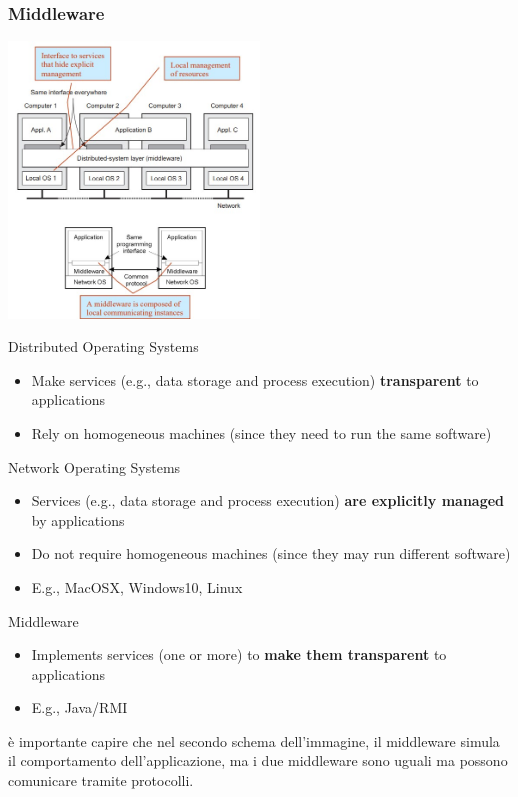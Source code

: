 \subsubsection{Middleware}
\begin{center}
    \includegraphics[width=0.5\textwidth]{img/Middleware1.jpg}
\end{center}
Distributed Operating Systems
\begin{itemize}
    \item Make services (e.g., data storage and process execution) \textbf{transparent} to applications
    \item Rely on homogeneous machines (since they need to run the same software)
\end{itemize}
Network Operating Systems
\begin{itemize}
    \item Services (e.g., data storage and process execution) \textbf{are explicitly managed} by applications
    \item Do not require homogeneous machines (since they may run different software)
    \item E.g., MacOSX, Windows10, Linux
\end{itemize}
Middleware
\begin{itemize}
    \item Implements services (one or more) to \textbf{make them transparent} to applications
    \item E.g., Java/RMI
\end{itemize}
è importante capire che nel secondo schema dell'immagine, il middleware simula il comportamento dell'applicazione, ma i due middleware sono uguali ma possono comunicare tramite protocolli.

